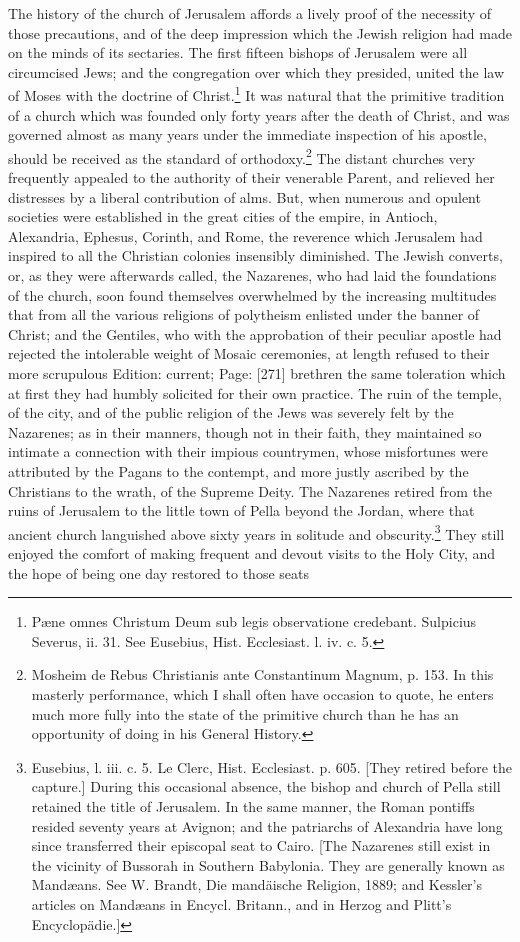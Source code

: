 The history of the church of Jerusalem affords a lively proof of the necessity of those precautions, and of the deep impression which the Jewish religion had made on the minds of its sectaries. The first fifteen bishops of Jerusalem were all circumcised Jews; and the congregation over which they presided, united the law of Moses with the doctrine of Christ.\footnote{Pæne omnes Christum Deum sub legis observatione credebant. Sulpicius Severus, ii. 31. See Eusebius, Hist. Ecclesiast. l. iv. c. 5.} It was natural that the primitive tradition of a church which was founded only forty years after the death of Christ, and was governed almost as many years under the immediate inspection of his apostle, should be received as the standard of orthodoxy.\footnote{Mosheim de Rebus Christianis ante Constantinum Magnum, p. 153. In this masterly performance, which I shall often have occasion to quote, he enters much more fully into the state of the primitive church than he has an opportunity of doing in his General History.} The distant churches very frequently appealed to the authority of their venerable Parent, and relieved her distresses by a liberal contribution of alms. But, when numerous and opulent societies were established in the great cities of the empire, in Antioch, Alexandria, Ephesus, Corinth, and Rome, the reverence which Jerusalem had inspired to all the Christian colonies insensibly diminished. The Jewish converts, or, as they were afterwards called, the Nazarenes, who had laid the foundations of the church, soon found themselves overwhelmed by the increasing multitudes that from all the various religions of polytheism enlisted under the banner of Christ; and the Gentiles, who with the approbation of their peculiar apostle had rejected the intolerable weight of Mosaic ceremonies, at length refused to their more scrupulous Edition: current; Page: [271] brethren the same toleration which at first they had humbly solicited for their own practice. The ruin of the temple, of the city, and of the public religion of the Jews was severely felt by the Nazarenes; as in their manners, though not in their faith, they maintained so intimate a connection with their impious countrymen, whose misfortunes were attributed by the Pagans to the contempt, and more justly ascribed by the Christians to the wrath, of the Supreme Deity. The Nazarenes retired from the ruins of Jerusalem to the little town of Pella beyond the Jordan, where that ancient church languished above sixty years in solitude and obscurity.\footnote{Eusebius, l. iii. c. 5. Le Clerc, Hist. Ecclesiast. p. 605. [They retired before the capture.] During this occasional absence, the bishop and church of Pella still retained the title of Jerusalem. In the same manner, the Roman pontiffs resided seventy years at Avignon; and the patriarchs of Alexandria have long since transferred their episcopal seat to Cairo. [The Nazarenes still exist in the vicinity of Bussorah in Southern Babylonia. They are generally known as Mandæans. See W. Brandt, Die mandäische Religion, 1889; and Kessler\texthebrew{}’s articles on Mandæans in Encycl. Britann., and in Herzog and Plitt\texthebrew{}’s Encyclopädie.]} They still enjoyed the comfort of making frequent and devout visits to the Holy City, and the hope of being one day restored to those seats 